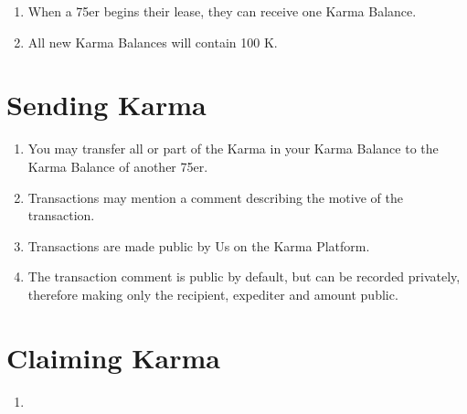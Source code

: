 \documentclass[12pt,a4paper]{article}
\begin{document}
\begin{enumerate}
	\item When a 75er begins their lease, they can receive one Karma Balance.
	\item All new Karma Balances will contain 100 K.

\end{enumerate}

\section{Sending Karma}

\begin{enumerate}
	\item You may transfer all or part of the Karma in your Karma Balance to the Karma Balance of another 75er. 
	\item Transactions may mention a comment describing the motive of the transaction.
	\item Transactions are made public by Us on the Karma Platform. 
	\item The transaction comment is public by default, but can be recorded privately, therefore making only the recipient, expediter and amount public.
\end{enumerate}

\section{Claiming Karma}

\begin{enumerate}
	\item 
\end{enumerate}
\end{document}
